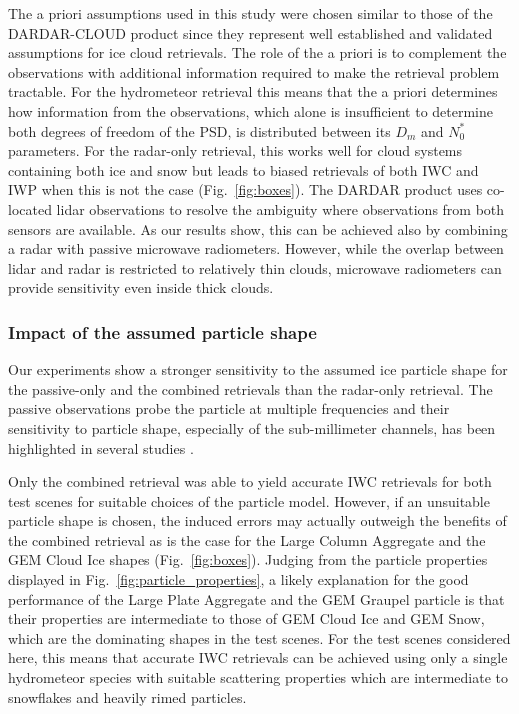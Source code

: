 \documentclass[journal abbreviation, manuscript]{copernicus}
\begin{document}
The a priori assumptions used in this study were chosen similar to those of the
DARDAR-CLOUD product since they represent well established and validated
assumptions for ice cloud retrievals. The role of the a priori is to complement
the observations with additional information required to make the retrieval
problem tractable. For the hydrometeor retrieval this means that the a priori
determines how information from the observations, which alone is insufficient to
determine both degrees of freedom of the PSD, is distributed between its $D_m$
and $N_0^*$ parameters. For the radar-only retrieval, this works well for cloud
systems containing both ice and snow but leads to biased retrievals of both IWC
and IWP when this is not the case (Fig.~\ref{fig:boxes}). The DARDAR product
uses co-located lidar observations to resolve the ambiguity where observations
from both sensors are available. As our results show, this can be achieved also
by combining a radar with passive microwave radiometers. However, while the
overlap between lidar and radar is restricted to relatively thin clouds,
microwave radiometers can provide sensitivity even inside thick clouds.

\subsubsection{Impact of the assumed particle shape}

Our experiments show a stronger sensitivity to the assumed ice particle shape
for the passive-only and the combined retrievals than the radar-only retrieval.
The passive observations probe the particle at multiple frequencies and their
sensitivity to particle shape, especially of the sub-millimeter channels, has
been highlighted in several studies \citep{ekelund20, fox19}.

Only the combined retrieval was able to yield accurate IWC retrievals for both
test scenes for suitable choices of the particle model. However, if an
unsuitable particle shape is chosen, the induced errors may actually outweigh
the benefits of the combined retrieval as is the case for the Large Column
Aggregate and the GEM Cloud Ice shapes (Fig.~\ref{fig:boxes}). Judging from the
particle properties displayed in Fig.~\ref{fig:particle_properties}, a likely
explanation for the good performance of the Large Plate Aggregate and the GEM
Graupel particle is that their properties are intermediate to those of GEM Cloud
Ice and GEM Snow, which are the dominating shapes in the test scenes. For the
test scenes considered here, this means that accurate IWC retrievals can be
achieved using only a single hydrometeor species with suitable scattering
properties which are intermediate to snowflakes and heavily rimed particles.
\end{document}
